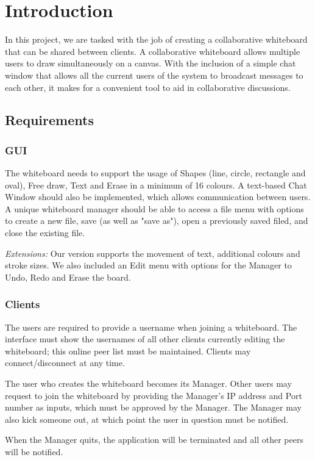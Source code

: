 \chapter{Introduction}
In this project, we are tasked with the job of creating a collaborative whiteboard that can be shared between clients. A collaborative whiteboard allows multiple users to draw simultaneously on a canvas. With the inclusion of a simple chat window that allows all the current users of the system to broadcast messages to each other, it makes for a convenient tool to aid in collaborative discussions.

\section{Requirements}
\subsection{GUI}
The whiteboard needs to support the usage of Shapes (line, circle, rectangle and oval), Free draw, Text and Erase in a minimum of 16 colours. A text-based Chat Window should also be implemented, which allows communication between users. A unique whiteboard manager should be able to access a file menu with options to create a new file, save (as well as "save as"), open a previously saved filed, and close the existing file.


\noindent \textit{Extensions:} Our version supports the movement of text, additional colours and stroke sizes. We also included an Edit menu with options for the Manager to Undo, Redo and Erase the board.
\subsection{Clients}
The users are required to provide a username when joining a whiteboard. The interface must show the usernames of all other clients currently editing the whiteboard; this online peer list must be maintained. Clients may connect/disconnect at any time.

\noindent The user who creates the whiteboard becomes its Manager. Other users may request to join the whiteboard by providing the Manager's IP address and Port number as inputs, which must be approved by the Manager. The Manager may also kick someone out, at which point the user in question must be notified.

\noindent When the Manager quits, the application will be terminated and all other peers will be notified.
